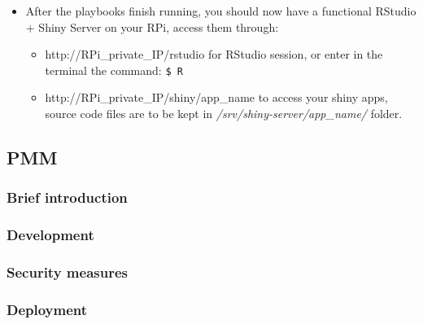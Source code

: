 \begin{itemize}
\begin{Shaded}
\begin{Highlighting}[]
\ExtensionTok{$} 
\end{Highlighting}
\end{Shaded}
\item
  After the playbooks finish running, you should now have a functional
  RStudio + Shiny Server on your RPi, access them through:

  \begin{itemize}
  \tightlist
  \item
    http://RPi\_private\_IP/rstudio for RStudio session, or enter in the
    terminal the command: \texttt{\$\ R}
  \item
    http://RPi\_private\_IP/shiny/app\_name to access your shiny apps,
    source code files are to be kept in
    \emph{/srv/shiny-server/app\_name/} folder.
  \end{itemize}
\end{itemize}

\newpage

\hypertarget{pmm}{%
\subsection{PMM}\label{pmm}}

\hypertarget{brief-introduction-1}{%
\subsubsection{Brief introduction}\label{brief-introduction-1}}

\hypertarget{development}{%
\subsubsection{Development}\label{development}}

\hypertarget{security-measures}{%
\subsubsection{Security measures}\label{security-measures}}

\hypertarget{deployment}{%
\subsubsection{Deployment}\label{deployment}}

